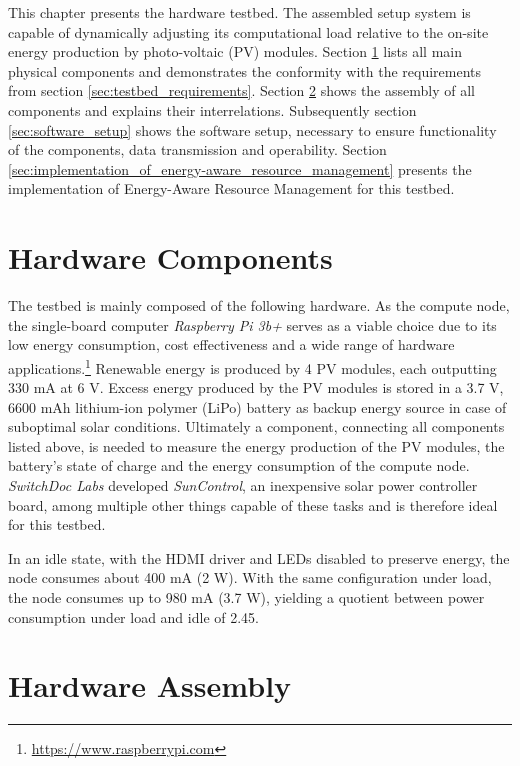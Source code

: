 This chapter presents the hardware testbed. The assembled setup system is
capable of dynamically adjusting its computational load relative to the on-site
energy production by photo-voltaic (PV) modules. Section
\ref{sec:hardware_components} lists all main physical components and
demonstrates the conformity with the requirements from section
\ref{sec:testbed_requirements}. Section \ref{sec:hardware_assembly} shows the
assembly of all components and explains their interrelations. Subsequently
section \ref{sec:software_setup} shows the software setup, necessary to ensure
functionality of the components, data transmission and operability. Section
\ref{sec:implementation_of_energy-aware_resource_management} presents the
implementation of Energy-Aware Resource Management for this testbed.

\section{Hardware Components}
\label{sec:hardware_components}

The testbed is mainly composed of the following hardware. As the compute node,
the single-board computer \emph{Raspberry Pi 3b+} serves as a viable choice due
to its low energy consumption, cost effectiveness and a wide range of hardware
applications.\footnote{\url{https://www.raspberrypi.com}} Renewable energy is
produced by 4 PV modules, each outputting 330 mA at 6 V. Excess energy produced
by the PV modules is stored in a 3.7 V, 6600 mAh lithium-ion polymer (LiPo)
battery as backup energy source in case of suboptimal solar conditions.
Ultimately a component, connecting all components listed above, is needed to
measure the energy production of the PV modules, the battery's state of charge
and the energy consumption of the compute node. \emph{SwitchDoc Labs} developed
\emph{SunControl}, an inexpensive solar power controller board, among multiple
other things capable of these tasks \cite{switchdoc_suncontrol} and is therefore
ideal for this testbed.

In an idle state, with the \textsc{HDMI} driver and \textsc{LED}s disabled to
preserve energy, the node consumes about 400 mA (2 W). With the same
configuration under load, the node consumes up to 980 mA (3.7 W), yielding a
quotient between power consumption under load and idle of 2.45.

\section{Hardware Assembly}
\label{sec:hardware_assembly}

